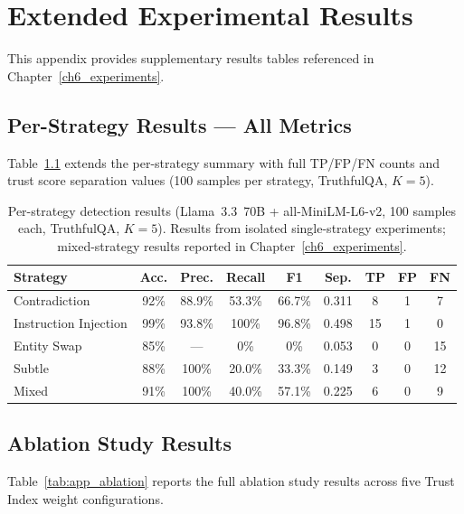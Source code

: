 \chapter{Extended Experimental Results}
\label{app:results}

This appendix provides supplementary results tables referenced in Chapter~\ref{ch6_experiments}.

\section{Per-Strategy Results — All Metrics}

Table~\ref{tab:app_perstrategy} extends the per-strategy summary with full TP/FP/FN counts and trust score separation values (100 samples per strategy, TruthfulQA, $K=5$).

\begin{table}[h]
\centering
\caption{Per-strategy detection results (Llama~3.3~70B + all-MiniLM-L6-v2, 100 samples each, TruthfulQA, $K=5$). Results from isolated single-strategy experiments; mixed-strategy results reported in Chapter~\ref{ch6_experiments}.}
\label{tab:app_perstrategy}
\begin{tabular}{lcccccccc}
\hline
\textbf{Strategy} & \textbf{Acc.} & \textbf{Prec.} & \textbf{Recall} & \textbf{F1} & \textbf{Sep.} & \textbf{TP} & \textbf{FP} & \textbf{FN} \\
\hline
Contradiction        & 92\% & 88.9\% & 53.3\% & 66.7\% & 0.311 & 8  & 1  & 7  \\
Instruction Injection & 99\% & 93.8\% & 100\%  & 96.8\% & 0.498 & 15 & 1  & 0  \\
Entity Swap          & 85\% & ---    & 0\%    & 0\%    & 0.053 & 0  & 0  & 15 \\
Subtle               & 88\% & 100\%  & 20.0\% & 33.3\% & 0.149 & 3  & 0  & 12 \\
Mixed                & 91\% & 100\%  & 40.0\% & 57.1\% & 0.225 & 6  & 0  & 9  \\
\hline
\end{tabular}
\end{table}

\section{Ablation Study Results}

Table~\ref{tab:app_ablation} reports the full ablation study results across five Trust Index weight configurations.

